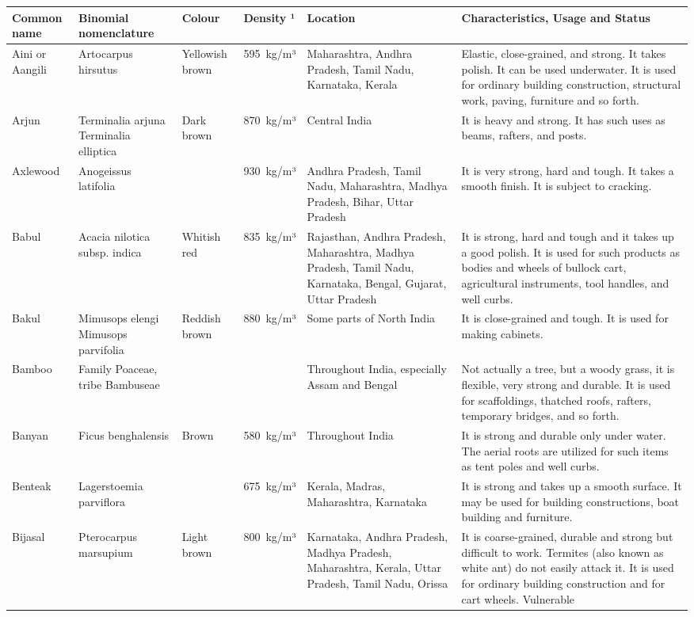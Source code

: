 \documentclass{article}
\begin{document}
\begin{tabular}{llllll}
\toprule
Common name & Binomial nomenclature & Colour & Density ¹ & Location & Characteristics, Usage and Status \\
\midrule
Aini or Aangili & Artocarpus hirsutus & Yellowish brown & 595 kg/m³ & Maharashtra, Andhra Pradesh, Tamil Nadu, Karnataka, Kerala & Elastic, close-grained, and strong. It takes polish. It can be used underwater. It is used for ordinary building construction, structural work, paving, furniture and so forth. \\
Arjun & Terminalia arjuna Terminalia elliptica & Dark brown & 870 kg/m³ & Central India & It is heavy and strong. It has such uses as beams, rafters, and posts. \\
Axlewood & Anogeissus latifolia &  & 930 kg/m³ & Andhra Pradesh, Tamil Nadu, Maharashtra, Madhya Pradesh, Bihar, Uttar Pradesh & It is very strong, hard and tough. It takes a smooth finish. It is subject to cracking. \\
Babul & Acacia nilotica subsp. indica & Whitish red & 835 kg/m³ & Rajasthan, Andhra Pradesh, Maharashtra, Madhya Pradesh, Tamil Nadu, Karnataka, Bengal, Gujarat, Uttar Pradesh & It is strong, hard and tough and it takes up a good polish. It is used for such products as bodies and wheels of bullock cart, agricultural instruments, tool handles, and well curbs. \\
Bakul & Mimusops elengi Mimusops parvifolia & Reddish brown & 880 kg/m³ & Some parts of North India & It is close-grained and tough. It is used for making cabinets. \\
Bamboo & Family Poaceae, tribe Bambuseae &  &  & Throughout India, especially Assam and Bengal & Not actually a tree, but a woody grass, it is flexible, very strong and durable. It is used for scaffoldings, thatched roofs, rafters, temporary bridges, and so forth. \\
Banyan & Ficus benghalensis & Brown & 580 kg/m³ & Throughout India & It is strong and durable only under water. The aerial roots are utilized for such items as tent poles and well curbs. \\
Benteak & Lagerstoemia parviflora &  & 675 kg/m³ & Kerala, Madras, Maharashtra, Karnataka & It is strong and takes up a smooth surface. It may be used for building constructions, boat building and furniture. \\
Bijasal & Pterocarpus marsupium & Light brown & 800 kg/m³ & Karnataka, Andhra Pradesh, Madhya Pradesh, Maharashtra, Kerala, Uttar Pradesh, Tamil Nadu, Orissa & It is coarse-grained, durable and strong but difficult to work. Termites (also known as white ant) do not easily attack it. It is used for ordinary building construction and for cart wheels. Vulnerable \\

\end{tabular}
\end{document}
